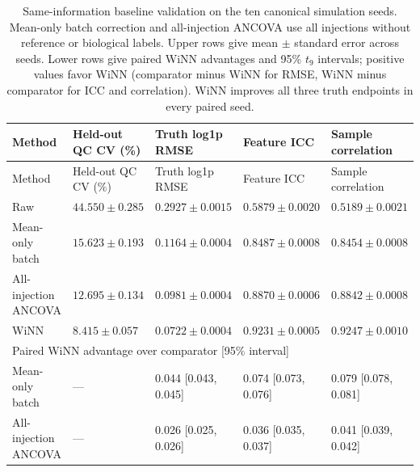 \begin{landscape}
\footnotesize
\begin{longtable}{p{3.3cm}p{2.4cm}p{4.1cm}p{4.1cm}p{4.1cm}}
\caption{Same-information baseline validation on the ten canonical simulation seeds. Mean-only batch correction and all-injection ANCOVA use all injections without reference or biological labels. Upper rows give mean $\pm$ standard error across seeds. Lower rows give paired WiNN advantages and 95\% $t_9$ intervals; positive values favor WiNN (comparator minus WiNN for RMSE, WiNN minus comparator for ICC and correlation). WiNN improves all three truth endpoints in every paired seed.}\label{tab:supp_baseline_truth}\\
\toprule
Method & Held-out QC CV (\%) & Truth log1p RMSE & Feature ICC & Sample correlation \\
\midrule
\endfirsthead
\toprule
Method & Held-out QC CV (\%) & Truth log1p RMSE & Feature ICC & Sample correlation \\
\midrule
\endhead
\bottomrule
\endlastfoot
Raw & $44.550 \pm 0.285$ & $0.2927 \pm 0.0015$ & $0.5879 \pm 0.0020$ & $0.5189 \pm 0.0021$ \\
Mean-only batch & $15.623 \pm 0.193$ & $0.1164 \pm 0.0004$ & $0.8487 \pm 0.0008$ & $0.8454 \pm 0.0008$ \\
All-injection ANCOVA & $12.695 \pm 0.134$ & $0.0981 \pm 0.0004$ & $0.8870 \pm 0.0006$ & $0.8842 \pm 0.0008$ \\
WiNN & $8.415 \pm 0.057$ & $0.0722 \pm 0.0004$ & $0.9231 \pm 0.0005$ & $0.9247 \pm 0.0010$ \\
\midrule
\multicolumn{5}{l}{Paired WiNN advantage over comparator [95\% interval]} \\
Mean-only batch & --- & 0.044 [0.043, 0.045] & 0.074 [0.073, 0.076] & 0.079 [0.078, 0.081] \\
All-injection ANCOVA & --- & 0.026 [0.025, 0.026] & 0.036 [0.035, 0.037] & 0.041 [0.039, 0.042] \\
\end{longtable}
\end{landscape}
